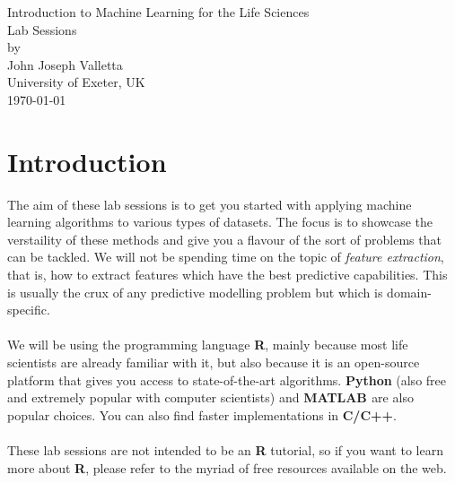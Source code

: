 \documentclass[a4paper,11pt]{article}
\begin{document}
\begin{center}
{\huge Introduction to Machine Learning for the Life Sciences\\[0.5cm]
Lab Sessions}\\[0.5cm]
by\\[0.5cm]
John Joseph Valletta\\
University of Exeter, UK\\[0.5cm]
{\large \today}\\[4cm]
\end{center}

\section{Introduction}
The aim of these lab sessions is to get you started with applying machine learning
algorithms to various types of datasets. The focus is to showcase the verstaility of
these methods and give you a flavour of the sort of problems that can be tackled.
We will not be spending time on the topic of \textit{feature extraction}, 
that is, how to extract features which have the best predictive capabilities. This is
usually the crux of any predictive modelling problem but which is domain-specific.
\\\\
We will be using the programming language \textbf{R}, mainly because most life scientists
are already familiar with it, but also because it is an open-source platform that gives you
access to state-of-the-art algorithms. \textbf{Python} (also free and extremely 
popular with computer scientists) and \textbf{MATLAB \textsuperscript{\textregistered}} are also
popular choices. You can also find faster implementations in \textbf{C/C++}.
\\\\
These lab sessions are not intended to be an \textbf{R} tutorial, so if you want to learn more
about \textbf{R}, please refer to the myriad of free resources available on the web.
\end{document}
